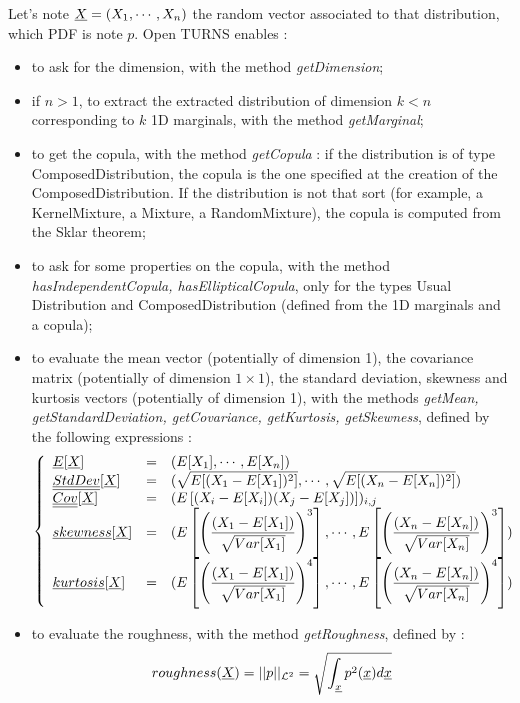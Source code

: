 Let's note ${\underline{X}} = (X_1, \cdots, X_n)$ the random vector associated to that distribution, which PDF is note $p$. Open TURNS enables :
\begin{itemize}
\item to ask for the dimension, with the method {\itshape getDimension};
\item if $n >1$, to extract the extracted distribution of dimension $k<n$ corresponding to $k$ 1D marginals, with the method {\itshape getMarginal};
\item to get the copula, with the method {\itshape getCopula} : if the distribution is of type ComposedDistribution, the copula is the one specified at the creation of the ComposedDistribution. If the distribution is not that sort (for example, a KernelMixture, a Mixture, a RandomMixture), the copula is computed from the Sklar theorem;
\item to ask for some properties on the copula, with the method {\itshape hasIndependentCopula, hasEllipticalCopula}, only for the types Usual Distribution and ComposedDistribution (defined from the 1D marginals and a copula);
\item to evaluate the mean vector (potentially of dimension 1), the covariance matrix (potentially of dimension $1\times 1$), the standard deviation, skewness and kurtosis vectors (potentially of dimension 1), with the methods {\itshape getMean, getStandardDeviation, getCovariance, getKurtosis, getSkewness}, defined by the following expressions :
  $$
  \left\{
    \begin{array}{lcl}
      \displaystyle {\underline{E}}[{\underline{X}}] & = & \displaystyle (E[X_1], \cdots, E[X_n]) \\
      \displaystyle {\underline{\underline{StdDev}}}[{\underline{X}}] & = & \displaystyle (\sqrt{E[(X_1-E[X_1])^2]}, \cdots, \sqrt{E[(X_n-E[X_n])^2]}) \\
      \displaystyle {\underline{\underline{Cov}}}[{\underline{X}}] & = & \displaystyle (E\left[(X_i-E[X_i])(X_j-E[X_j])\right])_{i,j} \\
      \displaystyle {\underline{skewness}}[{\underline{X}}] & = & \displaystyle (E\left[\left(\frac{(X_1-E[X_1])}{\sqrt{Var[X_1]}}\right)^3\right], \cdots, E\left[\left(\frac{(X_n-E[X_n])}{\sqrt{Var[X_n]}}\right)^3\right]) \\
      \displaystyle {\underline{kurtosis}}[{\underline{X}}] & = & \displaystyle (E\left[\left(\frac{(X_1-E[X_1])}{\sqrt{Var[X_1]}}\right)^4\right], \cdots, E\left[\left(\frac{(X_n-E[X_n])}{\sqrt{Var[X_n]}}\right)^4\right])
    \end{array}
  \right.
  $$
\item to evaluate the roughness, with the method {\itshape getRoughness}, defined by :
  $$
  roughness({\underline{X}}) = ||p||_{\mathcal{L}^2} = \sqrt{\int_{\underline{x}} p^2({\underline{x}})d{\underline{x}}}
  $$


\end{itemize}
